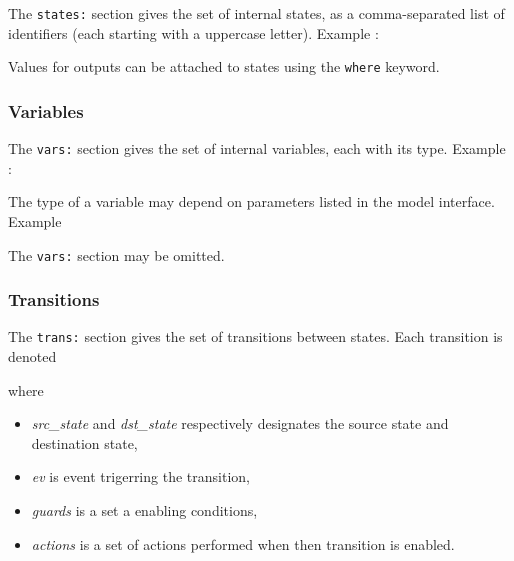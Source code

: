 The \verb|states:| section gives the set of internal states, as a comma-separated list of
identifiers (each starting with a uppercase letter). Example :

\begin{center}
\end{center}

Values for outputs can be attached to states using the \verb|where| keyword.

\begin{center}
\end{center}

\subsubsection*{Variables}
\label{sec:variables}

The \verb|vars:| section gives the set of internal variables, each with its type. Example :

\begin{center}
\end{center}

The type of a variable may depend on parameters listed in the model interface. Example

\begin{center}
\end{center}

The \verb|vars:| section may be omitted.

\subsubsection*{Transitions}
\label{sec:transitions}

The \verb|trans:| section gives the set of transitions between states. Each transition is denoted

\begin{center}
\end{center}

where
\begin{itemize}
\item \emph{src\_state} and \emph{dst\_state} respectively designates the source state and destination state,
\item \emph{ev} is event trigerring the transition,
\item \emph{guards} is a set a enabling conditions,
\item \emph{actions} is a set of actions performed when then transition is enabled.
\end{itemize}

